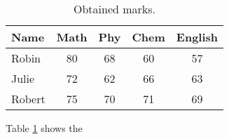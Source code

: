 \documentclass[a4paper]{article}
\begin{document}
\begin{table}[!htb] %
    \lipsum[2]
    \centering
    \caption{Obtained marks.} %
    \label{tab-marks} %
    \vspace{5pt}
    \begin{tabular}{|l|c|c|c|c|} %
    \hline 
    Name & Math & Phy & Chem & English\\
    \hline Robin & 80 & 68 & 60 & 57\\
    \hline Julie & 72 & 62 & 66 & 63\\
    \hline Robert & 75 & 70 & 71 & 69\\
    \hline
    \end{tabular}
\end{table}
    Table \ref{tab-marks} shows the\\[1cm]
    \lipsum[3]
\end{document}
